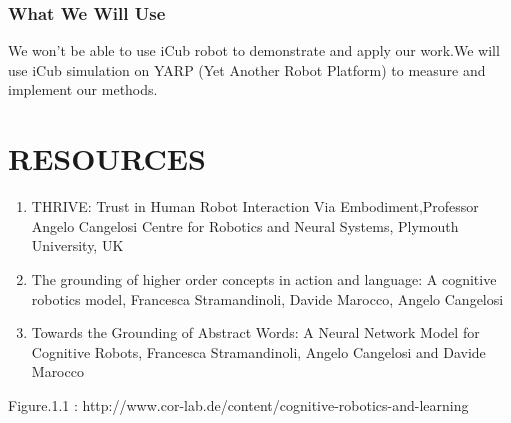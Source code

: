 \documentclass[12pt]{report}
\begin{document}
\subsection{What We Will Use}

We won't be able to use iCub robot to demonstrate and apply our work.We will use iCub simulation on YARP (Yet Another Robot Platform) to measure and implement our methods.

\chapter{RESOURCES}

\begin{enumerate}
	\item THRIVE: Trust in Human Robot Interaction Via Embodiment,Professor Angelo Cangelosi
Centre for Robotics and Neural Systems, Plymouth University, UK
	\item The grounding of higher order concepts in action and language: A cognitive robotics model, Francesca Stramandinoli, Davide Marocco, Angelo Cangelosi
	\item Towards the Grounding of Abstract Words: A Neural Network Model for Cognitive Robots, Francesca Stramandinoli, Angelo Cangelosi and Davide Marocco

\end{enumerate}


\begin{thebibliography}{9}
 Figure.1.1 : http://www.cor-lab.de/content/cognitive-robotics-and-learning

\end{thebibliography}
\end{document}
